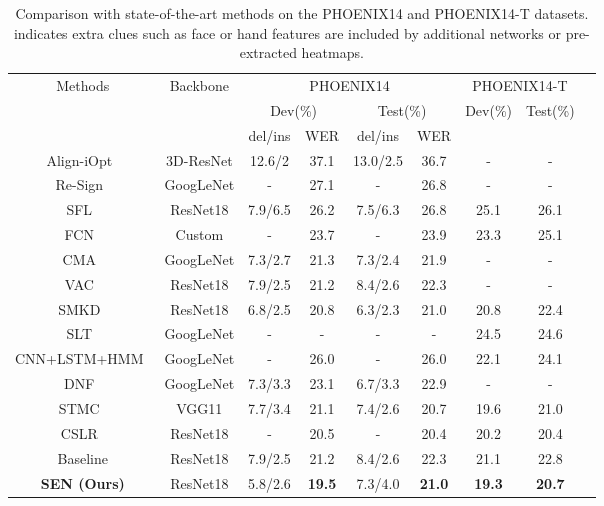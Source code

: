 \documentclass[letterpaper]{article} \usepackage{aaai23}  \usepackage{times}  \usepackage{helvet}  \usepackage{courier}  \usepackage[hyphens]{url}  \usepackage{graphicx} \urlstyle{rm} \def\UrlFont{\rm}  \usepackage{natbib}  \usepackage{caption} \frenchspacing  \setlength{\pdfpagewidth}{8.5in} \setlength{\pdfpageheight}{11in} \usepackage{algorithm}
\begin{document}
\begin{table*}[t]   
  \centering
  \setlength\tabcolsep{3pt}
  \begin{tabular}{ccccccccc}
  \hline
  \multirow{3}{*}{Methods} &\multirow{3}{*}{Backbone} & \multicolumn{4}{c}{PHOENIX14} & \multicolumn{2}{c}{PHOENIX14-T} \\
  & &\multicolumn{2}{c}{Dev(\%)} & \multicolumn{2}{c}{Test(\%)} &  \multirow{2}{*}{Dev(\%)} & \multirow{2}{*}{Test(\%)}\\
  & &del/ins & WER & del/ins& WER & & \\
  \hline
Align-iOpt~\cite{pu2019iterative}& 3D-ResNet &12.6/2 & 37.1& 13.0/2.5 & 36.7 & -&-\\
  Re-Sign~\cite{koller2017re}& GoogLeNet&- & 27.1 &- &26.8 &- &-\\
  SFL~\cite{niu2020stochastic}& ResNet18 & 7.9/6.5 & 26.2 & 7.5/6.3& 26.8 & 25.1&26.1\\
FCN~\cite{cheng2020fully}& Custom & - & 23.7 & -& 23.9 & 23.3& 25.1\\
  CMA~\cite{pu2020boosting} & GoogLeNet & 7.3/2.7 & 21.3 & 7.3/2.4 & 21.9  & -&-\\
  VAC~\cite{Min_2021_ICCV}& ResNet18 & 7.9/2.5 & 21.2 &8.4/2.6 & 22.3 &- &-\\
  SMKD~\cite{hao2021self}& ResNet18 &6.8/2.5 &20.8 &6.3/2.3 & 21.0 & 20.8 & 22.4\\
  \hline
  SLT~\cite{camgoz2018neural}& GoogLeNet  & - & - & - & - & 24.5 & 24.6\\
  CNN+LSTM+HMM~\cite{koller2019weakly}& GoogLeNet  & - &26.0 & - & 26.0 & 22.1 & 24.1 \\
  DNF~\cite{cui2019deep}& GoogLeNet  & 7.3/3.3 &23.1& 6.7/3.3 & 22.9 & - & -\\
  STMC~\cite{zhou2020spatial}& VGG11 & 7.7/3.4 &21.1 & 7.4/2.6 & 20.7 & 19.6 & 21.0\\
  CSLR~\cite{zuo2022c2slr} & ResNet18 & - & 20.5 &- & 20.4 & 20.2 & 20.4  \\
  \hline
  Baseline & ResNet18 & 7.9/2.5 & 21.2 &8.4/2.6 & 22.3 & 21.1 & 22.8\\
  \textbf{SEN (Ours)} & ResNet18 & 5.8/2.6  &\textbf{19.5} &   7.3/4.0 & \textbf{21.0}  & \textbf{19.3} & \textbf{20.7} \\
  \hline   
  \end{tabular}  
  \caption{Comparison with state-of-the-art methods on the PHOENIX14 and PHOENIX14-T datasets.  indicates extra clues such as face or hand features are included by additional networks or pre-extracted heatmaps.} 
  \label{tab7}
\end{table*}
\end{document}
